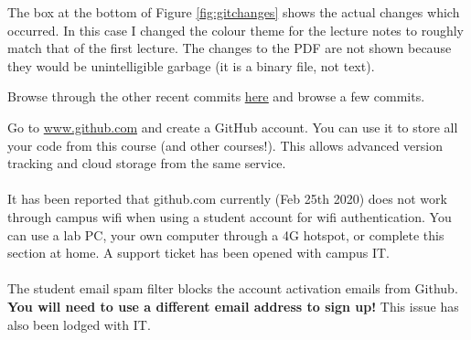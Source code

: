 \documentclass{lab}
\begin{document}
The box at the bottom of Figure \ref{fig:gitchanges} shows the actual changes which occurred. In this case I changed the colour theme for the lecture notes to roughly match that of the first lecture. The changes to the PDF are not shown because they would be unintelligible garbage (it is a binary file, not text).

Browse through the other recent commits \underline{\href{https://github.com/bschulznewy/engg1003/commits/master}{here}} and browse a few commits.

\begin{task}{}{} Go to \url{www.github.com} and create a GitHub account. You can use it to store all your code from this course (and other courses!). This allows advanced version tracking and cloud storage from the same service.\\
~\\
It has been reported that github.com currently (Feb 25th 2020) does not work through campus wifi when using a student account for wifi authentication. You can use a lab PC, your own computer through a 4G hotspot, or complete this section at home. A support ticket has been opened with campus IT.\\
~\\
The student email spam filter blocks the account activation emails from Github. \textbf{You will need to use a different email address to sign up!} This issue has also been lodged with IT.
\end{task}
\end{document}
